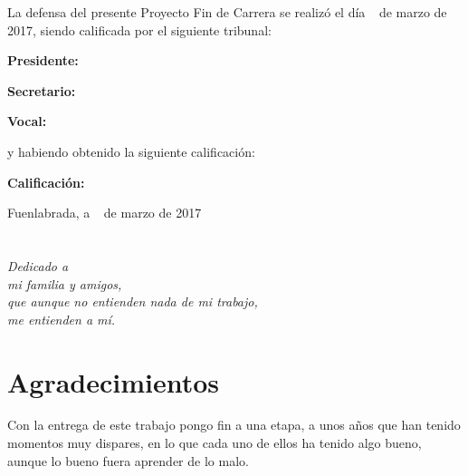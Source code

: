 \documentclass[a4paper, 12pt]{book}
\begin{document}
\vspace{1cm}
La defensa del presente Proyecto Fin de Carrera se realizó el día \qquad$\;\,$ de marzo de 2017, siendo calificada por el siguiente tribunal:


\vspace{0.5cm}
\textbf{Presidente:}

\vspace{1.2cm}
\textbf{Secretario:}

\vspace{1.2cm}
\textbf{Vocal:}


\vspace{1.2cm}
y habiendo obtenido la siguiente calificación:

\vspace{1cm}
\textbf{Calificación:}


\vspace{1cm}
\begin{flushright}
Fuenlabrada, a \qquad$\;\,$ de marzo de 2017
\end{flushright}


\chapter*{}
\begin{flushright}
\textit{Dedicado a \\
mi familia y amigos, \\
que aunque no entienden nada de mi trabajo, \\
me entienden a mí.}
\end{flushright}


\chapter*{Agradecimientos}

Con la entrega de este trabajo pongo fin a una etapa, a unos años que han tenido momentos muy dispares, en lo que cada uno de ellos ha tenido algo bueno, aunque lo bueno fuera aprender de lo malo.
\end{document}
